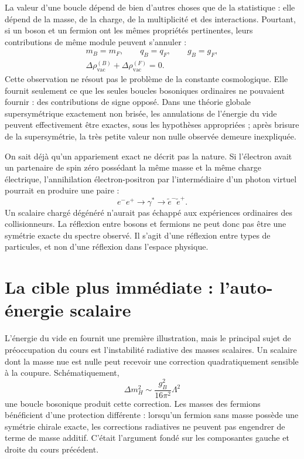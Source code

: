 La valeur d’une boucle dépend de bien d’autres choses que de la statistique : elle dépend de la masse, de la charge, de la multiplicité et des interactions. Pourtant, si un boson et un fermion ont les mêmes propriétés pertinentes, leurs contributions de même module peuvent s’annuler :
\begin{equation}
\begin{gathered}
m_B=m_F,\qquad q_B=q_F,\qquad g_B=g_F,\\
\Delta\rho_{\mathrm{vac}}^{(B)}
+\Delta\rho_{\mathrm{vac}}^{(F)}=0.
\end{gathered}
\end{equation}
Cette observation ne résout pas le problème de la constante cosmologique. Elle fournit seulement ce que les seules boucles bosoniques ordinaires ne pouvaient fournir : des contributions de signe opposé. Dans une théorie globale supersymétrique exactement non brisée, les annulations de l’énergie du vide peuvent effectivement être exactes, sous les hypothèses appropriées ; après brisure de la supersymétrie, la très petite valeur non nulle observée demeure inexpliquée.

On sait déjà qu’un appariement exact ne décrit pas la nature. Si l’électron avait un partenaire de spin zéro possédant la même masse et la même charge électrique, l’annihilation électron-positron par l’intermédiaire d’un photon virtuel pourrait en produire une paire :
\begin{equation}
e^-e^+\longrightarrow\gamma^*
\longrightarrow\widetilde e^-\widetilde e^+.
\end{equation}
Un scalaire chargé dégénéré n’aurait pas échappé aux expériences ordinaires des collisionneurs. La réflexion entre bosons et fermions ne peut donc pas être une symétrie exacte du spectre observé. Il s’agit d’une réflexion entre types de particules, et non d’une réflexion dans l’espace physique.

\section{La cible plus immédiate : l’auto-énergie scalaire}

L’énergie du vide en fournit une première illustration, mais le principal sujet de préoccupation du cours est l’instabilité radiative des masses scalaires. Un scalaire dont la masse nue est nulle peut recevoir une correction quadratiquement sensible à la coupure. Schématiquement,
\begin{equation}
\Delta m_H^2\sim \frac{g_B^2}{16\pi^2}\Lambda^2
\end{equation}
une boucle bosonique produit cette correction. Les masses des fermions bénéficient d’une protection différente : lorsqu’un fermion sans masse possède une symétrie chirale exacte, les corrections radiatives ne peuvent pas engendrer de terme de masse additif. C’était l’argument fondé sur les composantes gauche et droite du cours précédent.

